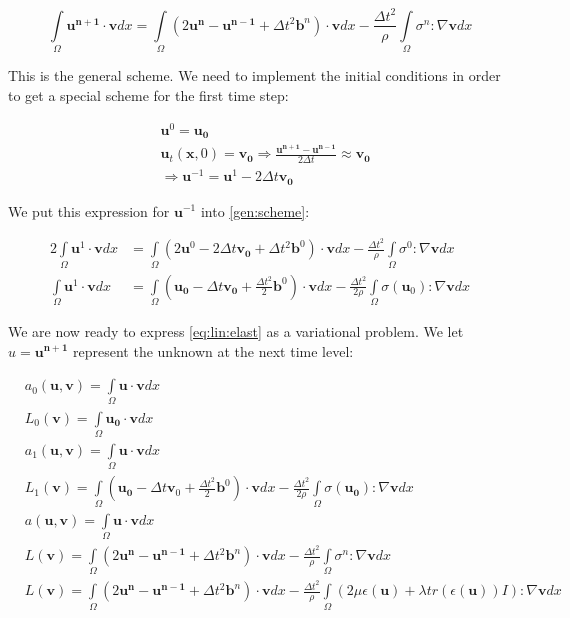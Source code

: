 \documentclass[twoside]{article}
\newcommand{\dtt}{\Delta t^2}
\newcommand{\dt}{\Delta t}
\newcommand{\unp}{\mathbf{u^{n+1}}}
\newcommand{\un}{\mathbf{u^{n}}}
\newcommand{\unm}{\mathbf{u^{n-1}}}
\newcommand{\io}{\int\limits_\Omega}
\begin{document}
\begin{equation}
\io \unp \cdot \mathbf{v} dx = \io (2\un - \unm  + \dtt \mathbf{b}^n) \cdot \mathbf{v} dx - \frac{\dtt}{\rho} \io \sigma^n : \nabla \mathbf{v} dx
\label{gen:scheme}
\end{equation}

This is the general scheme. We need to implement the initial conditions in order to get a special scheme for the first time step:

\begin{align}
&\mathbf{u}^0 = \mathbf{u_0} \nonumber\\
&\mathbf{u}_t(\mathbf{x},0) = \mathbf{v_0} \Rightarrow \frac{\unp - \unm}{2\dt}\approx \mathbf{v_0}\nonumber\\
&\Rightarrow \mathbf{u}^{-1} = \mathbf{u}^{1} - 2\dt \mathbf{v_0}\nonumber
\end{align}

We put this expression for $\mathbf{u}^{-1}$ into \eqref{gen:scheme}:

\begin{align}
2\io \mathbf{u}^{1} \cdot \mathbf{v} dx &= \io (2\mathbf{u}^{0} - 2\dt \mathbf{v_0}  + \dtt \mathbf{b}^0) \cdot \mathbf{v} dx - \frac{\dtt}{\rho} \io \sigma^0 : \nabla \mathbf{v} dx\nonumber\\
\io \mathbf{u}^{1} \cdot \mathbf{v} dx &= \io (\mathbf{u_0} - \dt \mathbf{v_0}  + \frac{\dtt}{2} \mathbf{b}^0) \cdot \mathbf{v} dx - \frac{\dtt}{2\rho} \io \sigma(\mathbf{u}_0) : \nabla \mathbf{v} dx
\label{first:step}
\end{align}

We are now ready to express \eqref{eq:lin:elast} as a variational problem. We let $u=\unp$ represent the unknown at the next time level:
\vspace{0.5cm}
\begin{mdframed}
\begin{align}
&a_0(\mathbf{u},\mathbf{v}) = \io \mathbf{u} \cdot \mathbf{v} dx \\
&L_0(\mathbf{v}) = \io \mathbf{u_0} \cdot \mathbf{v} dx \\
&a_1(\mathbf{u},\mathbf{v}) = \io \mathbf{u} \cdot \mathbf{v} dx \\
&L_1(\mathbf{v}) = \io (\mathbf{u_0} - \dt \mathbf{v}_0  + \frac{\dtt}{2} \mathbf{b}^0) \cdot \mathbf{v} dx - \frac{\dtt}{2\rho} \io \sigma(\mathbf{u_0}) : \nabla \mathbf{v} dx \\
&a(\mathbf{u},\mathbf{v}) = \io \mathbf{u} \cdot \mathbf{v} dx \\
&L(\mathbf{v}) = \io (2\un - \unm  + \dtt \mathbf{b}^n) \cdot \mathbf{v} dx - \frac{\dtt}{\rho} \io \sigma^n : \nabla \mathbf{v} dx\\
&L(\mathbf{v}) =  \io (2\un - \unm  + \dtt \mathbf{b}^n) \cdot \mathbf{v} dx - \frac{\dtt}{\rho} \io (2\mu\epsilon(\mathbf{u}) + \lambda tr(\epsilon(\mathbf{u}))I) : \nabla \mathbf{v} dx
\end{align}
\end{mdframed}
\end{document}
